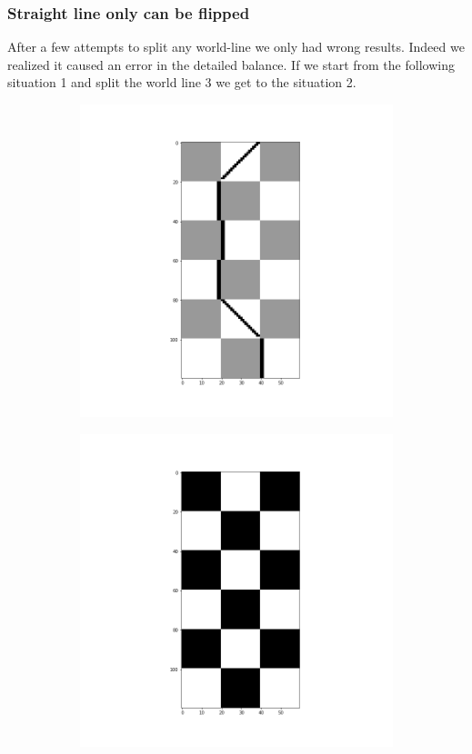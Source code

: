\documentclass[a4paper,12pt,twoside]{article}
\begin{document}
		 
	 \subsubsection{Straight line only can be flipped}
	 After a few attempts to split any world-line we only had wrong results. Indeed we realized it caused an error in the detailed balance. If we start from the following situation 1 and split the world line 3 we get to the situation 2.
	 
	 \begin{figure}[!h]
	 	\centering
	 	\begin{subfigure}[b]{0.3\textwidth}
	 		\includegraphics[scale=0.2]{situation1.png}
	 	\end{subfigure}
	 	\begin{subfigure}[b]{0.3\textwidth}
	 		\includegraphics[scale=0.2]{situation2.png}

\end{subfigure}
\end{figure}
\end{document}
